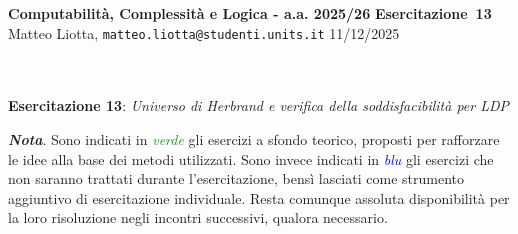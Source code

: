 \documentclass[a4paper,10pt]{article}
\makeatletter
\newcommand{\EsercitazioneNum}{13}
\newcommand{\Data}{11/12/2025}
\newcommand{\DocType}{Esercitazione} %
\newcommand{\FullTitle}{\DocType\ \EsercitazioneNum}
\newcommand{\Header}{
\noindent
  \small \textbf{Computabilità, Complessità e Logica - a.a. 2025/26} \hfill \textbf{\FullTitle} \\[0.2cm]
  \scriptsize Matteo Liotta, \texttt{matteo.liotta@studenti.units.it} \hfill \Data \\[0.2cm]
  \noindent\makebox[\linewidth]{\rule{\linewidth}{0.4pt}} \\[0.3cm]}
\makeatother
\begin{document}
\footnotesize  %
\Header\\[0.7cm]



    
    
    \noindent\Large \textbf{Esercitazione 13}: \textit{Universo di Herbrand e verifica della soddisfacibilità per LDP} 
    \begin{osservazioni}
        \textbf{\textit{Nota}}. Sono indicati in \textcolor{ForestGreen}{\textit{verde}} gli esercizi a sfondo teorico, proposti per rafforzare le idee alla base dei metodi utilizzati. Sono invece indicati in \textcolor{blue}{\textit{blu}} gli esercizi che non saranno trattati durante l'esercitazione, bensì lasciati come strumento aggiuntivo di esercitazione individuale. Resta comunque assoluta disponibilità per la loro risoluzione negli incontri successivi, qualora necessario. 
    \end{osservazioni}
    
\end{document}
